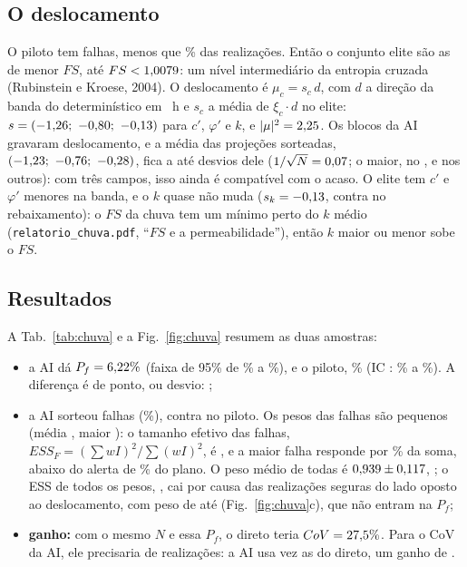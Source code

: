 \documentclass[11pt,a4paper]{article}
\begin{document}
\subsection{O deslocamento}
O piloto tem \ChPNf{} falhas, menos que \ChEliteFrac\% das \ChNP{} realizações. Então o conjunto elite são as
\ChElite{} de menor $FS$, até $FS < 1{,}0079$: um nível intermediário da entropia cruzada (Rubinstein e Kroese, 2004). O
deslocamento é $\mu_c = s_c\,d$, com $d$ a direção da banda do determinístico em \ChBandaT~h e $s_c$ a média de
$\xi_c \cdot d$ no elite: $s = (-1{,}26;\ -0{,}80;\ -0{,}13)$ para $c'$, $\varphi'$ e $k$, e $|\mu|^2 = 2{,}25$. Os
\ChDeslocBlocos{} blocos da AI gravaram \ChDeslocIguais{} deslocamento, e a média das projeções sorteadas,
$(-1{,}23;\ -0{,}76;\ -0{,}28)$, fica a até \ChProjMaxDif{} desvios dele ($1/\sqrt N = 0{,}07$; o maior, no \ChProjMaxCampo,
e \ChProjOutrasDif{} nos outros): com três campos, isso ainda é compatível com o acaso. O elite tem $c'$ e $\varphi'$
menores na banda, e o $k$ quase não muda ($s_k = -0{,}13$, contra \RbSK{} no rebaixamento): o $FS$ da chuva tem um mínimo
perto do $k$ médio (\texttt{relatorio\_chuva.pdf}, ``$FS$ e a permeabilidade''), então $k$ maior ou menor sobe o $FS$.

\subsection{Resultados}
A Tab.~\ref{tab:chuva} e a Fig.~\ref{fig:chuva} resumem as duas amostras:
\begin{itemize}
\item a AI dá $P_f = 6{,}22\%$ (faixa de 95\% de \ChALo\% a \ChAHi\%), e o piloto, \ChPPf\% (IC \ChPIC: \ChPLo\% a
\ChPHi\%). A diferença é de \ChDifPontos{} ponto, ou \ChDif{} desvio: \ChVies;
\item a AI sorteou \ChANf{} falhas (\ChAFrac\%), contra \ChPNf{} no piloto. Os pesos das falhas são pequenos (média
\ChAPesoFalha, maior \ChAPesoFalhaMax): o tamanho efetivo das falhas, $ESS_F = (\sum wI)^2/\sum (wI)^2$, é \ChAEssF, e a
maior falha responde por \ChAParcela\% da soma, abaixo do alerta de \AlertaParcela\% do plano. O peso médio de todas é
$0{,}939 \pm 0{,}117$, \ChAPesoCompat; o ESS de todos os pesos, \ChAEss, cai por causa das realizações seguras
do lado oposto ao deslocamento, com peso de até \ChAPesoMax{} (Fig.~\ref{fig:chuva}c), que não entram na $P_f$;
\item \textbf{ganho:} com o mesmo $N$ e essa $P_f$, o direto teria $CoV = 27{,}5\%$. Para o CoV da AI, ele
precisaria de \ChNParaCov{} realizações: a AI usa \ChRazao{} vez as do direto, um ganho de \ChGanho.
\end{itemize}
\end{document}
